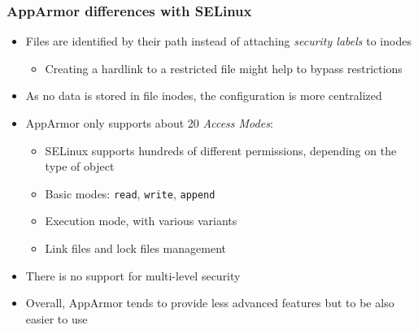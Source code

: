 \begin{frame}
	\frametitle{AppArmor differences with SELinux}
	\begin{itemize}
		\item Files are identified by their path instead of attaching \emph{security
			labels} to inodes
			\begin{itemize}
				\item Creating a hardlink to a restricted file might help to bypass
					restrictions
			\end{itemize}
		\item As no data is stored in file inodes, the configuration is more
			centralized
		\item AppArmor only supports about 20 \emph{Access Modes}:
			\begin{itemize}
				\item SELinux supports hundreds of different permissions, depending on
					the type of object
				\item Basic modes: \texttt{read}, \texttt{write}, \texttt{append}
				\item Execution mode, with various variants
				\item Link files and lock files management
			\end{itemize}
		\item There is no support for multi-level security
		\item Overall, AppArmor tends to provide less advanced features but to be
			also easier to use
	\end{itemize}
\end{frame}

